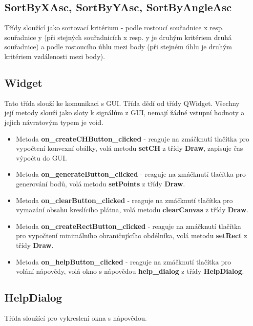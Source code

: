 \documentclass[a4paper, 12pt]{article}
\begin{document}
\subsection{SortByXAsc, SortByYAsc, SortByAngleAsc}
Třídy sloužící jako sortovací kritérium - podle rostoucí souřadnice x resp. souřadnice y (při stejných souřadnicích x resp. y je druhým kritériem druhá souřadnice) a podle rostoucího úhlu mezi body (při stejném úhlu je druhým kritériem vzdálenosti mezi body).

\subsection{Widget}
Tato třída slouží ke komunikaci s GUI. Třída dědí od třídy QWidget. Všechny její metody slouží jako sloty k signálům z GUI, nemají žádné vstupní hodnoty a jejich návratovým typem je void. 

\begin{itemize}
	\item Metoda \textbf{on\_createCHButton\_clicked} - reaguje na zmáčknutí tlačítka pro vypočtení konvexní obálky, volá metodu \textbf{setCH} z třídy \textbf{Draw}, zapisuje čas výpočtu do GUI.

	\item Metoda \textbf{on\_generateButton\_clicked} - reaguje na zmáčknutí tlačítka pro generování bodů, volá metodu \textbf{setPoints} z třídy \textbf{Draw}.

	\item Metoda \textbf{on\_clearButton\_clicked} - reaguje na zmáčknutí tlačítka pro vymazání obsahu kreslícího plátna, volá metodu \textbf{clearCanvas} z třídy \textbf{Draw}.

	\item Metoda \textbf{on\_createRectButton\_clicked} - reaguje na zmáčknutí tlačítka pro vypočtení minimálního ohraničujícího obdélníka, volá metodu \textbf{setRect} z třídy \textbf{Draw}.

	\item Metoda \textbf{on\_helpButton\_clicked} - reaguje na zmáčknutí tlačítka pro volání nápovědy, volá okno s nápovědou \textbf{help\_dialog} z třídy \textbf{HelpDialog}.

\end{itemize} 

\subsection{HelpDialog}
Třída sloužící pro vykreslení okna s nápovědou.
\end{document}
